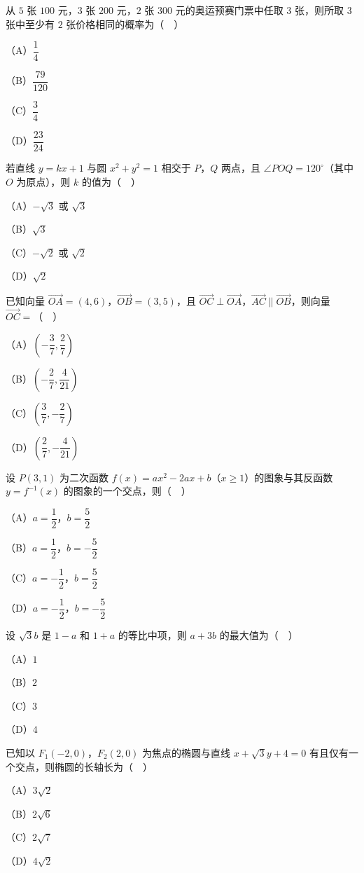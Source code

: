 \begin{question}
从 $5$ 张 $100$ 元，$3$ 张 $200$ 元，$2$ 张 $300$ 元的奥运预赛门票中任取 $3$ 张，则所取 $3$ 张中至少有 $2$ 张价格相同的概率为（　）

（A）$\dfrac14$

（B）$\dfrac{79}{120}$

（C）$\dfrac34$

（D）$\dfrac{23}{24}$

\end{question}
\begin{question}
若直线 $y=kx+1$ 与圆 $x^2+y^2=1$ 相交于 $P$，$Q$ 两点，且 $\angle POQ=120^\circ$（其中 $O$ 为原点），则 $k$ 的值为（　）

（A）$-\sqrt3$ 或 $\sqrt3$

（B）$\sqrt3$

（C）$-\sqrt2$ 或 $\sqrt2$

（D）$\sqrt2$

\end{question}
\begin{question}
已知向量 $\overrightarrow{OA}=(4,6)$，$\overrightarrow{OB}=(3,5)$，且 $\overrightarrow{OC}\perp\overrightarrow{OA}$，$\overrightarrow{AC}\parallel\overrightarrow{OB}$，则向量 $\overrightarrow{OC}=$（　）

（A）$\left(-\dfrac37,\dfrac27\right)$

（B）$\left(-\dfrac27,\dfrac4{21}\right)$

（C）$\left(\dfrac37,-\dfrac27\right)$

（D）$\left(\dfrac27,-\dfrac4{21}\right)$

\end{question}
\begin{question}
设 $P(3,1)$ 为二次函数 $f(x)=ax^2-2ax+b$（$x\geqslant1$）的图象与其反函数 $y=f^{-1}(x)$ 的图象的一个交点，则（　）

（A）$a=\dfrac12$，$b=\dfrac52$

（B）$a=\dfrac12$，$b=-\dfrac52$

（C）$a=-\dfrac12$，$b=\dfrac52$

（D）$a=-\dfrac12$，$b=-\dfrac52$

\end{question}
\begin{question}
设 $\sqrt3b$ 是 $1-a$ 和 $1+a$ 的等比中项，则 $a+3b$ 的最大值为（　）

（A）$1$

（B）$2$

（C）$3$

（D）$4$

\end{question}
\begin{question}
已知以 $F_1(-2,0)$，$F_2(2,0)$ 为焦点的椭圆与直线 $x+\sqrt3y+4=0$ 有且仅有一个交点，则椭圆的长轴长为（　）

（A）$3\sqrt2$

（B）$2\sqrt6$

（C）$2\sqrt7$

（D）$4\sqrt2$

\end{question}

